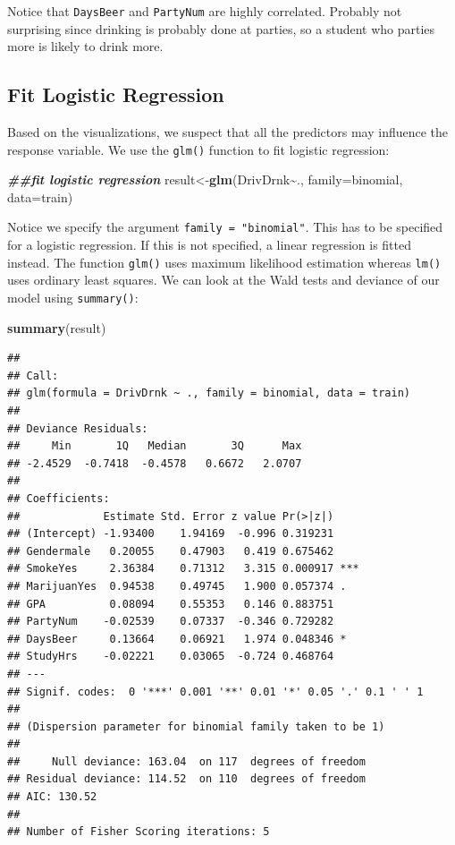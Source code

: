 \documentclass[
]{book}
\newenvironment{Shaded}{\begin{snugshade}}{\end{snugshade}}
\newcommand{\AttributeTok}[1]{\textcolor[rgb]{0.13,0.29,0.53}{#1}}
\newcommand{\DocumentationTok}[1]{\textcolor[rgb]{0.56,0.35,0.01}{\textbf{\textit{#1}}}}
\newcommand{\FunctionTok}[1]{\textcolor[rgb]{0.13,0.29,0.53}{\textbf{#1}}}
\newcommand{\NormalTok}[1]{#1}
\newcommand{\OtherTok}[1]{\textcolor[rgb]{0.56,0.35,0.01}{#1}}
\newcommand{\SpecialCharTok}[1]{\textcolor[rgb]{0.81,0.36,0.00}{\textbf{#1}}}
\begin{document}
Notice that \texttt{DaysBeer} and \texttt{PartyNum} are highly correlated. Probably not surprising since drinking is probably done at parties, so a student who parties more is likely to drink more.

\hypertarget{fit-logistic-regression}{%
\subsection*{Fit Logistic Regression}\label{fit-logistic-regression}}

Based on the visualizations, we suspect that all the predictors may influence the response variable. We use the \texttt{glm()} function to fit logistic regression:

\begin{Shaded}
\begin{Highlighting}[]
\DocumentationTok{\#\#fit logistic regression}
\NormalTok{result}\OtherTok{\textless{}{-}}\FunctionTok{glm}\NormalTok{(DrivDrnk}\SpecialCharTok{\textasciitilde{}}\NormalTok{., }\AttributeTok{family=}\NormalTok{binomial, }\AttributeTok{data=}\NormalTok{train)}
\end{Highlighting}
\end{Shaded}

Notice we specify the argument \texttt{family\ =\ "binomial"}. This has to be specified for a logistic regression. If this is not specified, a linear regression is fitted instead. The function \texttt{glm()} uses maximum likelihood estimation whereas \texttt{lm()} uses ordinary least squares. We can look at the Wald tests and deviance of our model using \texttt{summary()}:

\begin{Shaded}
\begin{Highlighting}[]
\FunctionTok{summary}\NormalTok{(result)}
\end{Highlighting}
\end{Shaded}

\begin{verbatim}
## 
## Call:
## glm(formula = DrivDrnk ~ ., family = binomial, data = train)
## 
## Deviance Residuals: 
##     Min       1Q   Median       3Q      Max  
## -2.4529  -0.7418  -0.4578   0.6672   2.0707  
## 
## Coefficients:
##             Estimate Std. Error z value Pr(>|z|)    
## (Intercept) -1.93400    1.94169  -0.996 0.319231    
## Gendermale   0.20055    0.47903   0.419 0.675462    
## SmokeYes     2.36384    0.71312   3.315 0.000917 ***
## MarijuanYes  0.94538    0.49745   1.900 0.057374 .  
## GPA          0.08094    0.55353   0.146 0.883751    
## PartyNum    -0.02539    0.07337  -0.346 0.729282    
## DaysBeer     0.13664    0.06921   1.974 0.048346 *  
## StudyHrs    -0.02221    0.03065  -0.724 0.468764    
## ---
## Signif. codes:  0 '***' 0.001 '**' 0.01 '*' 0.05 '.' 0.1 ' ' 1
## 
## (Dispersion parameter for binomial family taken to be 1)
## 
##     Null deviance: 163.04  on 117  degrees of freedom
## Residual deviance: 114.52  on 110  degrees of freedom
## AIC: 130.52
## 
## Number of Fisher Scoring iterations: 5
\end{verbatim}
\end{document}
